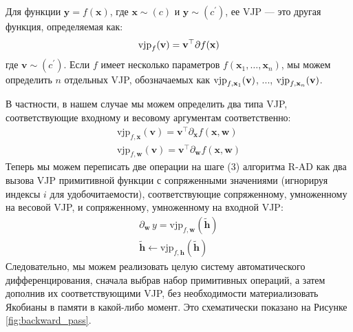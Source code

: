 \begin{definition} \addbottle
    Для функции $\mathbf{y}=f(\mathbf{x})$, где $\mathbf{x} \sim (c)$ и $\mathbf{y} \sim (c^\prime)$, ее VJP — это другая функция, определяемая как:
    \begin{equation}
    \textnormal{vjp}_f(\mathbf{v})=\mathbf{v}^\top \partial f(\mathbf{x})
    \end{equation}
    где $\mathbf{v}\sim (c^\prime)$. Если $f$ имеет несколько параметров $f(\mathbf{x}_1, \ldots, \mathbf{x}_n)$, мы можем определить $n$ отдельных VJP, обозначаемых как $\textnormal{vjp}_{f,\mathbf{x}_1}(\mathbf{v})$, ..., $\textnormal{vjp}_{f, \mathbf{x}_n}(\mathbf{v})$.
\end{definition}

В частности, в нашем случае мы можем определить два типа VJP, соответствующие входному и весовому аргументам соответственно:
%
\begin{gather}
\text{vjp}_{f,\mathbf{x}}(\mathbf{v})=\mathbf{v}^\top\partial_\mathbf{x}f(\mathbf{x},\mathbf{w}) \label{eq:input_jacobian}\\
\text{vjp}_{f, \mathbf{w}}(\mathbf{v})=\mathbf{v}^\top\partial_\mathbf{w}f(\mathbf{x},\mathbf{w})\label{eq:weight_jacobian}
\end{gather}
%
Теперь мы можем переписать две операции на шаге (3) алгоритма R-AD как два вызова VJP примитивной функции с сопряженными значениями (игнорируя индексы $i$ для удобочитаемости), соответствующие сопряженному, умноженному на весовой VJP, и сопряженному, умноженному на входной VJP:
%
\begin{gather}
\partial_{\mathbf{w}} \, y = \text{vjp}_{f,\mathbf{w}}\left(\widetilde{\mathbf{h}}\right) \label{eq:r_ad_1}\\
\widetilde{\mathbf{h}}  \gets \text{vjp}_{f, \mathbf{h}}\left(\widetilde{\mathbf{h}}\right) \label{eq:r_ad_2}
\end{gather}
%
Следовательно, мы можем реализовать целую систему автоматического дифференцирования, сначала выбрав набор примитивных операций, а затем дополнив их соответствующими VJP, без необходимости материализовать Якобианы в памяти в какой-либо момент. Это схематически показано на Рисунке \ref{fig:backward_pass}. 

